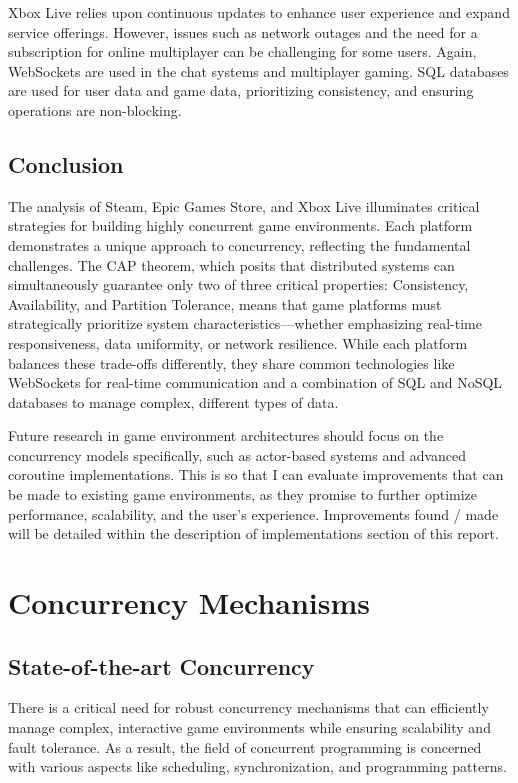 \documentclass[]{interim}
\begin{document}
Xbox Live relies upon continuous updates to enhance user experience and
expand service offerings. However, issues such as network outages and the need
for a subscription for online multiplayer can be challenging for some users.
Again, WebSockets are used in the chat systems and multiplayer gaming.
SQL databases are used for user data and game data,\cite{woolsey_how_2024}
prioritizing consistency, and ensuring operations are non-blocking.


\section{Conclusion}

The analysis of Steam, Epic Games Store, and Xbox Live illuminates
critical strategies for building highly concurrent game environments. Each platform
demonstrates a unique approach to concurrency, reflecting the fundamental challenges.
The CAP theorem, which posits that distributed systems can
simultaneously guarantee only two of three critical properties: Consistency,
Availability, and Partition Tolerance, means that game platforms must
strategically prioritize system characteristics—whether emphasizing real-time
responsiveness, data uniformity, or network resilience.
\cite{gilbert_perspectives_2012} While each platform balances these
trade-offs differently, they share common technologies like WebSockets for real-time
communication and a combination of SQL and NoSQL databases to manage complex,
different types of data.

Future research in game environment architectures should focus
on the concurrency models specifically, such as actor-based systems and advanced coroutine
implementations. This is so that I can evaluate improvements that can be made to
existing game environments, as they promise to further optimize performance, scalability,
and the user's experience. Improvements found / made will be detailed within
the description of implementations section of this report.

\chapter{Concurrency Mechanisms}
\section{State-of-the-art Concurrency}

There is a critical need for robust concurrency mechanisms that can efficiently
manage complex, interactive game environments while ensuring scalability
and fault tolerance. As a result, the field of concurrent programming is concerned
with various aspects like scheduling, synchronization, and programming patterns.
\end{document}
